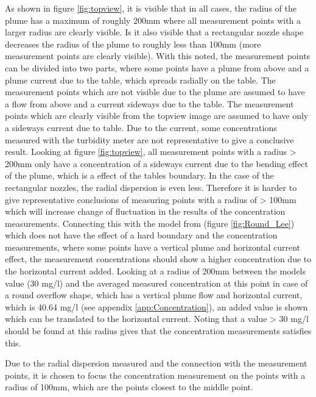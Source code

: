 \noindent As shown in figure \ref{fig:topview}, it is visible that in all cases, the radius of the plume has a maximum of roughly 200mm where all measurement points with a larger radius are clearly visible. Is it also visible that a rectangular nozzle shape decreases the radius of the plume to roughly less than 100mm (more measurement points are clearly visible). With this noted, the measurement points can be divided into two parts, where some points have a plume from above and a plume current due to the table, which spreads radially on the table. The measurement points which are not visible due to the plume are assumed to have a flow from above and a current sideways due to the table. The measurement points which are clearly visible from the topview image are assumed to have only a sideways current due to table. \newline
\noindent Due to the current, some concentrations measured with the turbidity meter are not representative to give a conclusive result. Looking at figure \ref{fig:topview}, all measurement points with a radius > 200mm only have a concentration of a sideways current due to the bending effect of the plume, which is a effect of the tables boundary. In the case of the rectangular nozzles, the radial dispersion is even less. Therefore it is harder to give representative conclusions of measuring points with a radius of > 100mm which will increase change of fluctuation in the results of the concentration measurements. \newline
\noindent Connecting this with the model from \cite{Lee+} (figure \ref{fig:Round_Lee}) which does not have the effect of a hard boundary and the concentration measurements, where some points have a vertical plume and horizontal current effect, the measurement concentrations should show a higher concentration due to the horizontal current added. Looking at a radius of 200mm between the models value (30 mg/l) and the averaged measured concentration at this point in case of a round overflow shape, which has a vertical plume flow and horizontal current, which is 40.64 mg/l (see appendix \ref{app:Concentration}), an added value is shown which can be translated to the horizontal current. Noting that a value > 30 mg/l should be found at this radius gives that the concentration measurements satisfies this. \newline


\noindent Due to the radial dispersion measured and the connection with the measurement points, it is chosen to focus the concentration measurement on the points with a radius of 100mm, which are the points closest to the middle point.

